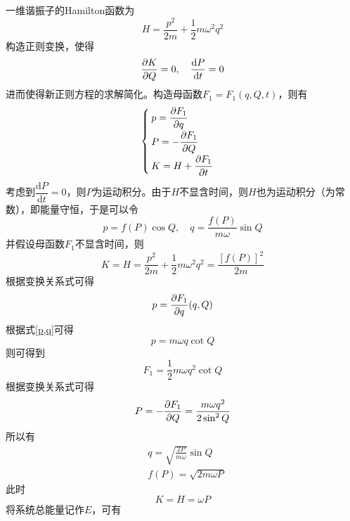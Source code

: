 \begin{example}[一维谐振子的正则变换求解]
一维谐振子的Hamilton函数为
\begin{equation*}
	H = \frac{p^2}{2m} + \frac12 m\omega^2 q^2
\end{equation*}
构造正则变换，使得
\begin{equation*}
	\frac{\partial K}{\partial Q} = 0,\quad \frac{\mathrm{d} P}{\mathrm{d} t} = 0
\end{equation*}
进而使得新正则方程的求解简化。构造母函数$F_1 = F_1(q,Q,t)$，则有
\begin{equation*}
	\begin{cases}
		\displaystyle p = \frac{\partial F_1}{\partial q} \\[1.5ex]
		\displaystyle P = -\frac{\partial F_1}{\partial Q} \\[1.5ex]
		\displaystyle K = H + \frac{\partial F_1}{\partial t}
	\end{cases}
\end{equation*}
考虑到$\dfrac{\mathrm{d} P}{\mathrm{d} t} = 0$，则$P$为运动积分。由于$H$不显含时间，则$H$也为运动积分（为常数），即能量守恒，于是可以令
\begin{equation}
	p = f(P) \cos Q,\quad q = \frac{f(P)}{m\omega} \sin Q
	\label{p,q}
\end{equation}
并假设母函数$F_1$不显含时间，则
\begin{equation*}
	K = H = \frac{p^2}{2m} + \frac12 m\omega^2 q^2 = \frac{[f(P)]^2}{2m}
\end{equation*}
根据变换关系式可得
\begin{equation*}
	p = \frac{\partial F_1}{\partial q}(q,Q)
\end{equation*}
根据式\eqref{p,q}可得
\begin{equation*}
	p = m\omega q \cot Q
\end{equation*}
则可得到
\begin{equation*}
	F_1 = \frac12 m\omega q^2 \cot Q 
\end{equation*}
根据变换关系式可得
\begin{equation*}
	P = -\frac{\partial F_1}{\partial Q} = \frac{m\omega q^2}{2\sin^2 Q}
\end{equation*}
所以有
\begin{align*}
	& q = \sqrt{\frac{2P}{m\omega}} \sin Q \\
	& f(P) = \sqrt{2m\omega P}
\end{align*}
此时
\begin{equation*}
	K = H = \omega P
\end{equation*}
将系统总能量记作$E$，可有
\begin{equation*}

\end{equation*}
\end{example}
